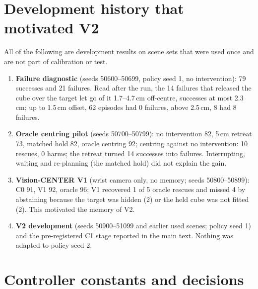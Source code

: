 \documentclass[preprint,12pt]{elsarticle}
\begin{document}
\section{Development history that motivated V2}\label{sec:s-history}

All of the following are development results on scene sets that were used once and are not part of calibration or test.
\begin{enumerate}
\item \textbf{Failure diagnostic} (seeds 50600--50699, policy seed 1, no intervention): 79 successes and 21 failures. Read after the run, the 14 failures that released the cube over the target let go of it 1.7--4.7\,cm off-centre, successes at most 2.3\,cm; up to 1.5\,cm offset, 62 episodes had 0 failures, above 2.5\,cm, 8 had 8 failures.
\item \textbf{Oracle centring pilot} (seeds 50700--50799): no intervention 82, 5\,cm retreat 73, matched hold 82, oracle centring 92; centring against no intervention: 10 rescues, 0 harms; the retreat turned 14 successes into failures. Interrupting, waiting and re-planning (the matched hold) did not explain the gain.
\item \textbf{Vision-CENTER V1} (wrist camera only, no memory; seeds 50800--50899): C0 91, V1 92, oracle 96; V1 recovered 1 of 5 oracle rescues and missed 4 by abstaining because the target was hidden (2) or the held cube was not fitted (2). This motivated the memory of V2.
\item \textbf{V2 development} (seeds 50900--51099 and earlier used scenes; policy seed 1) and the pre-registered C1 stage reported in the main text. Nothing was adapted to policy seed 2.
\end{enumerate}

\section{Controller constants and decisions}\label{sec:s-constants}
\end{document}
